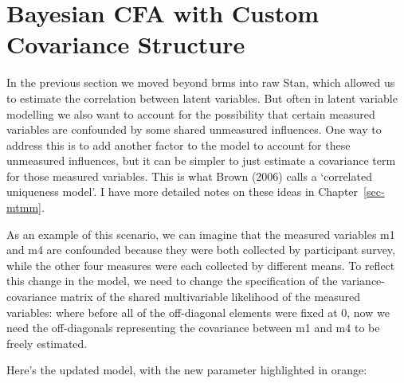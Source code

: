 \documentclass[
  letterpaper,
  DIV=11,
  numbers=noendperiod]{scrreprt}
\begin{document}
\hypertarget{bayesian-cfa-with-custom-covariance-structure}{%
\section{Bayesian CFA with Custom Covariance
Structure}\label{bayesian-cfa-with-custom-covariance-structure}}

In the previous section we moved beyond brms into raw Stan, which
allowed us to estimate the correlation between latent variables. But
often in latent variable modelling we also want to account for the
possibility that certain measured variables are confounded by some
shared unmeasured influences. One way to address this is to add another
factor to the model to account for these unmeasured influences, but it
can be simpler to just estimate a covariance term for those measured
variables. This is what Brown (2006) calls a `correlated uniqueness
model'. I have more detailed notes on these ideas in
Chapter~\ref{sec-mtmm}.

As an example of this scenario, we can imagine that the measured
variables m1 and m4 are confounded because they were both collected by
participant survey, while the other four measures were each collected by
different means. To reflect this change in the model, we need to change
the specification of the variance-covariance matrix of the shared
multivariable likelihood of the measured variables: where before all of
the off-diagonal elements were fixed at 0, now we need the off-diagonals
representing the covariance between m1 and m4 to be freely estimated.

Here's the updated model, with the new parameter highlighted in orange:
\end{document}
